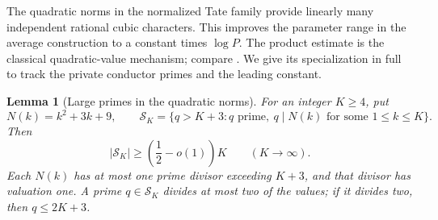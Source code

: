 \documentclass[11pt]{article}
\newtheorem{lemma}[theorem]{Lemma}
\theoremstyle{definition}
\theoremstyle{remark}
\begin{document}
The quadratic norms in the normalized Tate family provide linearly many
independent rational cubic characters.  This improves the parameter
range in the average construction to a constant times $\log P$.
The product estimate is the classical quadratic-value mechanism;
compare \citet[Lemmas~1, 3, and 4 and \S2.4, pp.~1131--1134]{Cilleruelo2011}.
We give its specialization in full to track the private conductor
primes and the leading constant.  

\begin{lemma}[Large primes in the quadratic norms]
\label{lem:tate-large-prime-norms}
For an integer $K\ge4$, put
\[
 N(k)=k^2+3k+9,\qquad
 \mathcal S_K=\{q>K+3:q\text{ prime},\ q\mid N(k)
                      \text{ for some }1\le k\le K\}.
\]
Then
\begin{equation}\label{eq:tate-large-prime-count}
 |\mathcal S_K|\ge\left(\frac12-o(1)\right)K
 \qquad(K\longrightarrow\infty).
\end{equation}
Each $N(k)$ has at most one prime divisor exceeding $K+3$, and
that divisor has valuation one.  A prime $q\in\mathcal S_K$
divides at most two of the values; if it divides two, then
$q\le2K+3$.
\end{lemma}
\end{document}
